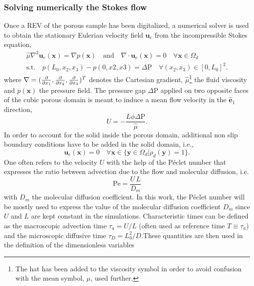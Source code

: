 \subsubsection{Solving numerically the Stokes flow}
Once a REV of the porous sample has been digitalized, a numerical solver is used to obtain the stationary Eulerian velocity field $\textbf{u}_e$ from the incompressible Stokes equation,
\begin{equation}\label{eq:stokes}
\begin{array}{c}
	\hat{\mu}\nabla^2\textbf{u}_e(\textbf{x}) = \nabla p(\textbf{x}) \quad\textrm{and}\quad \nabla\cdot\textbf{u}_e(\textbf{x})=0\quad \forall \textbf{x}\in\Omega_d\\
	\textrm{s.t.}\quad p(L_0,x_2,x_3) - p(0,x2,x3) = \Delta\textrm{P} \quad \forall (x_2,x_3)\in[0,L_0]^2.
\end{array}
\end{equation}
where $\nabla = (\pdv{x_1},\pdv{x_2},\pdv{x_3})^T$ denotes the Cartesian gradient, $\hat{\mu}$\footnote{The hat has been added to the viscosity symbol in order to avoid confusion with the mean symbol, $\mu$, used further.} the fluid viscosity and $p(\textbf{x})$ the pressure field.
The pressure gap $\Delta\textrm{P}$ applied on two opposite faces of the cubic porous domain is meant to induce a mean flow velocity in the $\hat{\textbf{e}}_1$ direction, 
\[
U=-\frac{L \phi \Delta\textrm{P}}{\hat\mu}.
\]
In order to account for the solid inside the porous domain, additional non slip boundary conditions have to be added in the solid domain, i.e.,
\begin{equation}\label{eq:nonslip_sideBC}
\textbf{u}_e(\textbf{x})=0 \quad\forall \textbf{x} \in \{\textbf{y}\in\Omega_d|\rho_d(\textbf{y})=1\}.
\end{equation}
One often refers to the velocity $U$ with the help of the Péclet number that expresses the ratio between advection due to the flow and molecular diffusion, i.e.
\begin{equation}\label{eq:peclet}
\textrm{Pe}=\frac{U\,L}{D_m}
\end{equation}
with $D_m$ the molecular diffusion coefficient. 
In this work, the Péclet number will be mostly used to express the value of the molecular diffusion coefficient $D_m$ since $U$ and $L$ are kept constant in the simulations.
Characteristic times can be defined as the macroscopic advection time $\tau_a=U/L$ (often used as reference time $T\equiv\tau_a$) and the microscopic diffusive time $\tau_D=L_0^2/D$.These quantities are then used in the definition of the dimensionless variables
